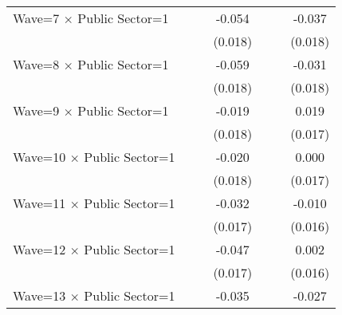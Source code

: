 {\begin{tabular}{l*{6}{c}}
Wave=7 $\times$ Public Sector=1&                     &                     &      -0.054\sym{***}&                     &                     &      -0.037\sym{**} \\
                    &                     &                     &     (0.018)         &                     &                     &     (0.018)         \\
Wave=8 $\times$ Public Sector=1&                     &                     &      -0.059\sym{***}&                     &                     &      -0.031\sym{*}  \\
                    &                     &                     &     (0.018)         &                     &                     &     (0.018)         \\
Wave=9 $\times$ Public Sector=1&                     &                     &      -0.019         &                     &                     &       0.019         \\
                    &                     &                     &     (0.018)         &                     &                     &     (0.017)         \\
Wave=10 $\times$ Public Sector=1&                     &                     &      -0.020         &                     &                     &       0.000         \\
                    &                     &                     &     (0.018)         &                     &                     &     (0.017)         \\
Wave=11 $\times$ Public Sector=1&                     &                     &      -0.032\sym{*}  &                     &                     &      -0.010         \\
                    &                     &                     &     (0.017)         &                     &                     &     (0.016)         \\
Wave=12 $\times$ Public Sector=1&                     &                     &      -0.047\sym{***}&                     &                     &       0.002         \\
                    &                     &                     &     (0.017)         &                     &                     &     (0.016)         \\
Wave=13 $\times$ Public Sector=1&                     &                     &      -0.035\sym{**} &                     &                     &      -0.027\sym{*}  \\

\end{tabular}}
